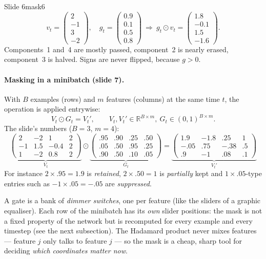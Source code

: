\documentclass[11pt,a4paper]{article}
\newcommand{\R}{\mathbb{R}}
\newcommand{\vc}[1]{\begin{pmatrix}#1\end{pmatrix}}
\begin{document}
\begin{example}{Slide 6}{mask6}
\[
v_t=\vc{2\\-1\\3\\-2},\quad g_t=\vc{0.9\\0.1\\0.5\\0.8}\ \Longrightarrow\ g_t\odot v_t=\vc{1.8\\-0.1\\1.5\\-1.6}.
\]
Components~1 and~4 are mostly passed, component~2 is nearly erased, component~3 is halved. Signs are never flipped, because $g>0$.
\end{example}

\paragraph{Masking in a minibatch (slide 7).} With $B$ examples (rows) and $m$ features (columns) at the same time $t$, the operation is applied entrywise:
\[
V_t\odot G_t=V_t',\qquad V_t,V_t'\in\R^{B\times m},\ G_t\in(0,1)^{B\times m}.
\]
The slide's numbers ($B=3$, $m=4$):
\[
\underbrace{\begin{pmatrix}2&-2&1&2\\-1&1.5&-0.4&2\\1&-2&0.8&2\end{pmatrix}}_{V_t}
\odot
\underbrace{\begin{pmatrix}.95&.90&.25&.50\\.05&.50&.95&.25\\.90&.50&.10&.05\end{pmatrix}}_{G_t}
=
\underbrace{\begin{pmatrix}1.9&-1.8&.25&1\\-.05&.75&-.38&.5\\.9&-1&.08&.1\end{pmatrix}}_{V_t'}
\]
For instance $2\times.95=1.9$ is \emph{retained}, $2\times.50=1$ is \emph{partially} kept and $1\times.05$-type entries such as $-1\times.05=-.05$ are \emph{suppressed}.

\begin{intuition}
A gate is a bank of \emph{dimmer switches}, one per feature (like the sliders of a graphic equaliser). Each row of the minibatch has its \emph{own} slider positions: the mask is not a fixed property of the network but is recomputed for every example and every timestep (see the next subsection). The Hadamard product never mixes features --- feature $j$ only talks to feature $j$ --- so the mask is a cheap, sharp tool for deciding \emph{which coordinates matter now}.
\end{intuition}
\end{document}
